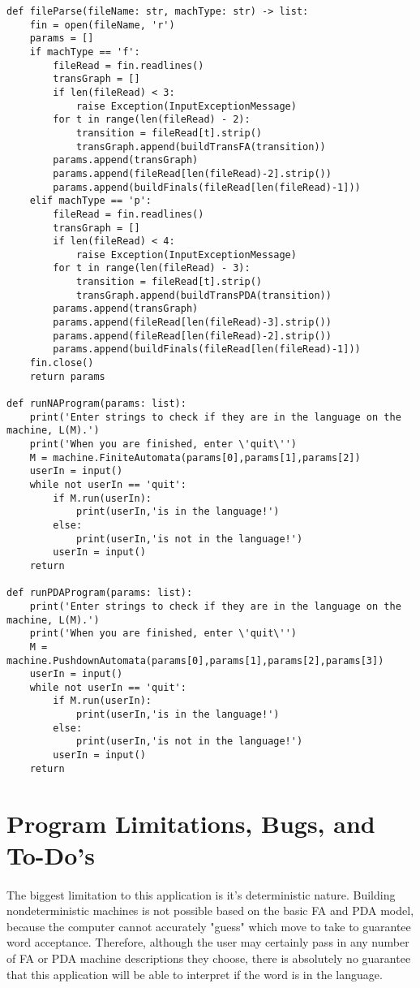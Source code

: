 \documentclass[12pt]{article}
\begin{document}
\begin{lstlisting}
def fileParse(fileName: str, machType: str) -> list:
    fin = open(fileName, 'r')
    params = []
    if machType == 'f':
        fileRead = fin.readlines()
        transGraph = []
        if len(fileRead) < 3:
            raise Exception(InputExceptionMessage)
        for t in range(len(fileRead) - 2):
            transition = fileRead[t].strip()
            transGraph.append(buildTransFA(transition))
        params.append(transGraph)
        params.append(fileRead[len(fileRead)-2].strip())
        params.append(buildFinals(fileRead[len(fileRead)-1]))
    elif machType == 'p':
        fileRead = fin.readlines()
        transGraph = []
        if len(fileRead) < 4:
            raise Exception(InputExceptionMessage)
        for t in range(len(fileRead) - 3):
            transition = fileRead[t].strip()
            transGraph.append(buildTransPDA(transition))
        params.append(transGraph)
        params.append(fileRead[len(fileRead)-3].strip())
        params.append(fileRead[len(fileRead)-2].strip())
        params.append(buildFinals(fileRead[len(fileRead)-1]))
    fin.close()
    return params

def runNAProgram(params: list):
    print('Enter strings to check if they are in the language on the machine, L(M).')
    print('When you are finished, enter \'quit\'')
    M = machine.FiniteAutomata(params[0],params[1],params[2])
    userIn = input()
    while not userIn == 'quit':
        if M.run(userIn):
            print(userIn,'is in the language!')
        else:
            print(userIn,'is not in the language!')
        userIn = input()
    return 

def runPDAProgram(params: list):
    print('Enter strings to check if they are in the language on the machine, L(M).')
    print('When you are finished, enter \'quit\'')
    M = machine.PushdownAutomata(params[0],params[1],params[2],params[3])
    userIn = input()
    while not userIn == 'quit':
        if M.run(userIn):
            print(userIn,'is in the language!')
        else:
            print(userIn,'is not in the language!')
        userIn = input()
    return
\end{lstlisting}

\section{Program Limitations, Bugs, and To-Do's}
\paragraph{}
The biggest limitation to this application is it's deterministic nature.  Building nondeterministic 
machines is not possible based on the basic FA and PDA model, because the computer cannot 
accurately "guess" which move to take to guarantee word acceptance.  Therefore, although the 
user may certainly pass in any number of FA or PDA machine descriptions they choose, there is absolutely 
no guarantee that this application will be able to interpret if the word is in the language.
\end{document}
